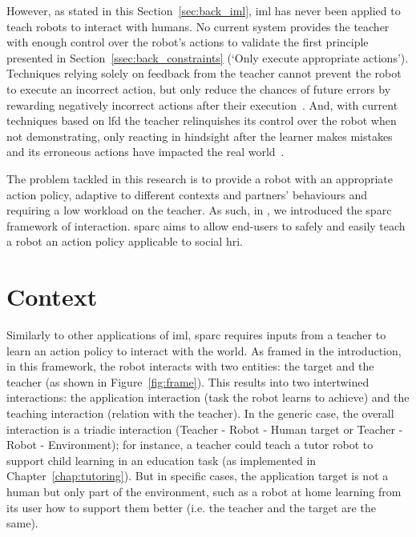 However, as stated in this Section~\ref{sec:back_iml}, \gls{iml} has never been applied to teach robots to interact with humans. No current system provides the teacher with enough control over the robot's actions to validate the first principle presented in Section~\ref{ssec:back_constraints} (`Only execute appropriate actions'). Techniques relying solely on feedback from the teacher cannot prevent the robot to execute an incorrect action, but only reduce the chances of future errors by rewarding negatively incorrect actions after their execution~\citep{senft2017supervised}. And, with current techniques based on \gls{lfd} the teacher relinquishes its control over the robot when not demonstrating, only reacting in hindsight after the learner makes mistakes and its erroneous actions have impacted the real world~\citep{chernova2009interactive}.

The problem tackled in this research is to provide a robot with an appropriate action policy, adaptive to different contexts and partners' behaviours and requiring a low workload on the teacher. As such, in \cite{senft2015sparc}, we introduced the \gls{sparc} framework of interaction. \gls{sparc} aims to allow end-users to safely and easily teach a robot an action policy applicable to social \gls{hri}.


\section{Context}

Similarly to other applications of \gls{iml}, \gls{sparc} requires inputs from a teacher to learn an action policy to interact with the world. As framed in the introduction, in this framework, the robot interacts with two entities: the target and the teacher (as shown in Figure~\ref{fig:frame}). This results into two intertwined interactions: the application interaction (task the robot learns to achieve) and the teaching interaction (relation with the teacher). In the generic case, the overall interaction is a triadic interaction (Teacher - Robot - Human target or Teacher - Robot - Environment); for instance, a teacher could teach a tutor robot to support child learning in an education task (as implemented in Chapter~\ref{chap:tutoring}). But in specific cases, the application target is not a human but only part of the environment, such as a robot at home learning from its user how to support them better (i.e. the teacher and the target are the same).

